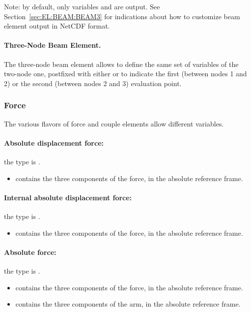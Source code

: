 Note: by default, only variables 
and  are output.
See Section~\ref{sec:EL:BEAM:BEAM3} for indications
about how to customize beam element output in NetCDF format.

\paragraph{Three-Node Beam Element.}
The three-node beam element allows to define the same set of variables
of the two-node one, postfixed with either  or 
to indicate the first (between nodes 1 and 2)
or the second (between nodes 2 and 3)
evaluation point.




\subsubsection{Force}
\label{sec:NetCDF:Elem:Force}

The various flavors of force and couple elements allow different variables.

\paragraph{Absolute displacement force:}
the type is .
\begin{itemize}
\item {} contains the three components of the force, in the absolute reference frame.
\end{itemize}

\paragraph{Internal absolute displacement force:}
the type is .
\begin{itemize}
\item {} contains the three components of the force, in the absolute reference frame.
\end{itemize}

\paragraph{Absolute force:}
the type is .
\begin{itemize}
\item {} contains the three components of the force, in the absolute reference frame.
\item {} contains the three components of the arm, in the absolute reference frame.
\end{itemize}


